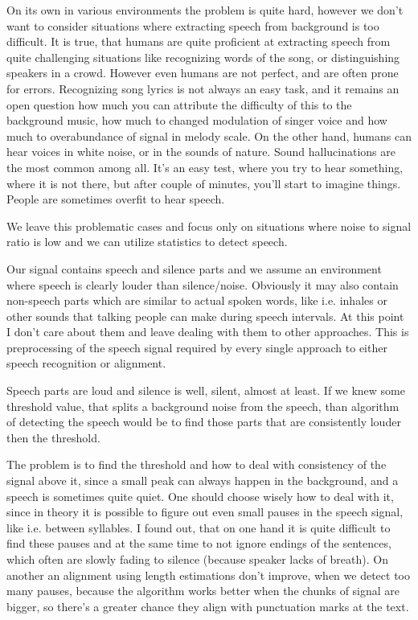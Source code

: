 \documentclass[12pt,a4paper,english]{article}
\begin{document}
On its own in various environments  the problem is quite hard, however we don't want to consider situations where extracting speech from background is too difficult. It is true, that humans are quite proficient at extracting speech from quite challenging situations like recognizing words of the song, or distinguishing speakers in a crowd.
However even humans are not perfect, and are often prone for errors. Recognizing song lyrics is not always an easy task, and it remains an open question how much you can attribute the difficulty of this to the background music, how much to changed modulation of singer voice and how much to overabundance of signal in melody scale.
On the other hand, humans can hear voices in white noise, or in the sounds of nature. Sound hallucinations are the most common among all. It's an easy test, where you try to hear something, where it is not there, but after couple of minutes, you'll start to imagine things. People are sometimes overfit to hear speech. \newline

We leave this problematic cases and focus only on situations where noise to signal ratio is low and we can utilize statistics to detect speech. \newline

Our signal contains speech and silence parts and we assume an environment where speech is clearly louder than silence/noise. Obviously it may also contain non-speech parts which are similar to actual spoken words, like i.e. inhales or other sounds that talking people can make during speech intervals. At this point I don't care about them and leave dealing with them to other approaches. \newline
This is preprocessing of the speech signal required by every single approach to either speech recognition or alignment. 

\newpage

Speech parts are loud and silence is well, silent, almost at least. If we knew some threshold value, that splits a background noise from the speech, than algorithm of detecting the speech would be to find those parts that are consistently louder then the threshold.  \newline

The problem is to find the threshold and how to deal with consistency of the signal above it, since a small peak can always happen in the background, and a speech is sometimes quite quiet. \newline
One should choose wisely how to deal with it, since in theory it is possible to figure out even small pauses in the speech signal, like i.e. between syllables.
I found out, that on one hand it is quite difficult to find these pauses and at the same time to not ignore endings of the sentences, which often are slowly fading to silence (because speaker lacks of breath). On another an alignment using length estimations don't improve, when we detect too many pauses,
because the algorithm works better when the chunks of signal are bigger, so there's a greater chance they align with punctuation marks at the text. \newline
\end{document}
